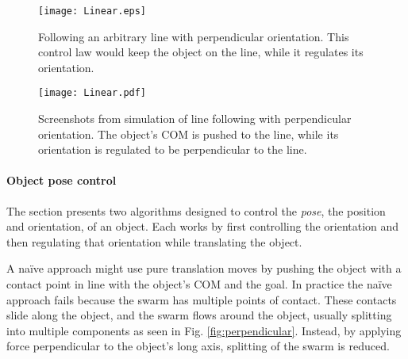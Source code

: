 \begin{figure}
\begin{center}
	\texttt{[image: Linear.eps]}
\end{center}
\vspace{-2em}
\caption{\label{fig:Linear} 
Following an arbitrary line with perpendicular orientation. This control law would keep the object on the line, while it regulates its orientation.
}
\vspace{-1em}
\end{figure}

\begin{figure*}
\centering

\texttt{[image: Linear.pdf]}
\vspace{0em}
\caption{\label{fig:LinearScreenShots}
Screenshots from simulation of line following with perpendicular orientation.
 The object's COM is pushed to the line, while its orientation is regulated to be perpendicular to the line.
}
\end{figure*}








\paragraph{Object pose control}
The section presents two algorithms designed to control the \emph{pose}, the position and orientation, of an object.  
Each works by first controlling the orientation and then regulating that orientation while translating the object. 

A na\"{i}ve approach might use pure translation moves by  pushing  the object with a contact point in line with the object's COM and the goal.
In practice the na\"{i}ve approach fails because the swarm has multiple points of contact. These contacts slide along the object, and the swarm flows around the object, usually splitting into multiple components as seen in Fig. \ref{fig:perpendicular}.
Instead, by applying force perpendicular to the object's long axis, splitting of the swarm is reduced. 

